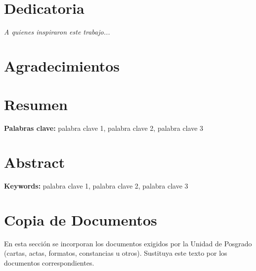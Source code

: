 \documentclass[12pt,a4paper,oneside]{book}
\newcommand{\texten}[1]{\foreignlanguage{english}{#1}}
\newcommand{\dockeywords}{palabra clave 1, palabra clave 2, palabra clave 3}
\theoremstyle{plain}
\theoremstyle{definition}
\theoremstyle{remark}
\begin{document}
\chapter*{Dedicatoria}
\begin{flushright}
    \itshape
    A quienes inspiraron este trabajo...
\end{flushright}

\chapter*{Agradecimientos}
\lipsum[1-2]

\chapter*{Resumen}
\noindent\textbf{Palabras clave:} \dockeywords

\vspace{1cm}
\lipsum[3]

\chapter*{Abstract}
\noindent\textbf{Keywords:} \texten{\dockeywords}

\vspace{1cm}
\texten{\lipsum[3]}

\chapter*{Copia de Documentos}

\noindent En esta sección se incorporan los documentos exigidos por la Unidad de Posgrado (cartas, actas,
formatos, constancias u otros). Sustituya este texto por los documentos correspondientes.

\end{document}
